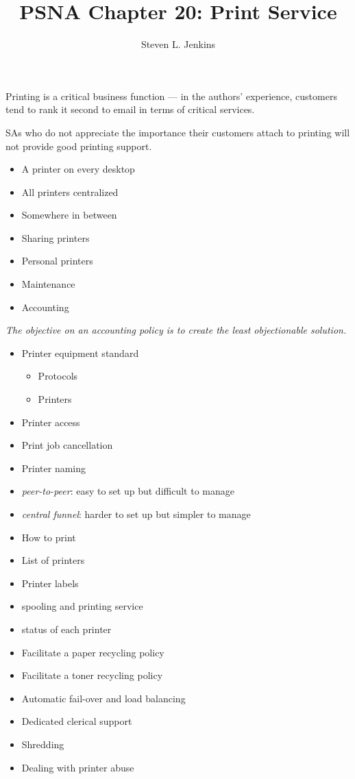 \documentclass{slides}
\title{PSNA Chapter 20: Print Service}
\author{Steven L. Jenkins}
\newcommand{\bi}{\begin{itemize}}
\newcommand{\ei}{\end{itemize}}
\begin{document}

Printing is a critical business function  --- in the authors' experience,
customers tend to rank it second to email in terms of critical services.

SAs who do not appreciate the importance their customers attach to
printing will not provide good printing support.  


\bi
\item A printer on every desktop
\item All printers centralized
\item Somewhere in between
\ei


\bi
\item Sharing printers
\item Personal printers
\item Maintenance
\item Accounting
\ei

\emph{The objective on an accounting policy is to create the least 
objectionable solution.}


\bi
\item Printer equipment standard
  \bi
    \item Protocols
    \item Printers
  \ei
\item Printer access
\item Print job cancellation
\item Printer naming
\ei


\bi
\item \emph{peer-to-peer}: easy to set up but difficult to manage
\item \emph{central funnel}: harder to set up but simpler to manage
\ei


\bi
\item How to print
\item List of printers
\item Printer labels
\ei


\bi
\item spooling and printing service
\item status of each printer
\ei


\bi
\item Facilitate a paper recycling policy
\item Facilitate a toner recycling policy
\ei


\bi
\item Automatic fail-over and load balancing
\item Dedicated clerical support
\item Shredding
\item Dealing with printer abuse
\ei
\end{document}

